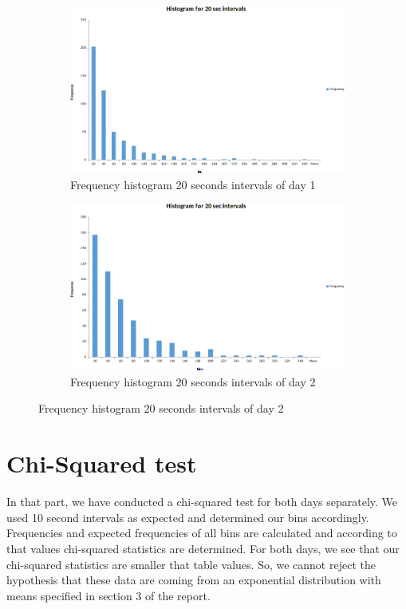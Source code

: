 \documentclass{article}
\begin{document}
\begin{figure}[H]
    \begin{subfigure}{0.5\textwidth}
        \includegraphics[width=\linewidth]{day1-hist-20sec.png}
        \caption{Frequency histogram 20 seconds intervals of day 1}
    \end{subfigure}
    \begin{subfigure}{0.5\textwidth}
        \includegraphics[width=\linewidth]{day2-hist-20sec.png}
        \caption{Frequency histogram 20 seconds intervals of day 2}
    \end{subfigure}
\end{figure}

\newpage

\section{Chi-Squared test}
In that part, we have conducted a chi-squared test for both days separately. We used 10 second intervals as expected and determined our bins accordingly. Frequencies and expected frequencies of all bins are calculated and according to that values chi-squared statistics are determined. For both days, we see that our chi-squared statistics are smaller that table values. So, we cannot reject the hypothesis that these data are coming from an exponential distribution with means specified in section 3 of the report.
\end{document}

